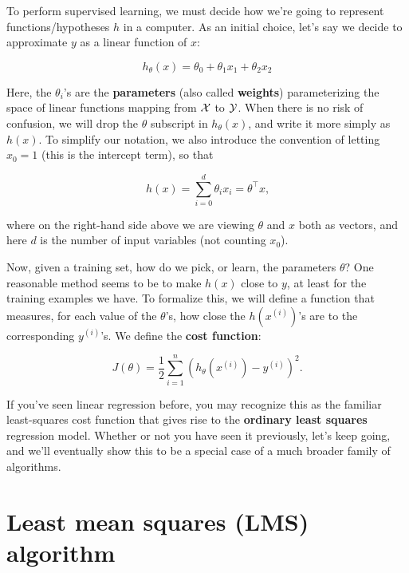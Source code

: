 To perform supervised learning, we must decide how we're going to represent
functions/hypotheses $h$ in a computer. As an initial choice, let's say
we decide to approximate $y$ as a linear function of $x$:

\begin{equation}
    h_\theta(x) = \theta_0 + \theta_1 x_1 + \theta_2 x_2
\end{equation}

Here, the $\theta_i$'s are the \textbf{parameters} (also called \textbf{weights}) parameterizing the
space of linear functions mapping from $\cal X$ to $\cal Y$. When there is no risk of
confusion, we will drop the $\theta$ subscript in $h_\theta(x)$, and write it more simply as
$h(x)$. To simplify our notation, we also introduce the convention of letting
$x_0 = 1$ (this is the intercept term), so that

\begin{equation}
    h(x) = \sum_{i=0}^d \theta_i x_i = \theta^\top x\text{,} %
\end{equation}

where on the right-hand side above we are viewing $\theta$ and $x$ both as vectors,
and here $d$ is the number of input variables (not counting $x_0$).

Now, given a training set, how do we pick, or learn, the parameters $\theta$?
One reasonable method seems to be to make $h(x)$ close to $y$, at least for
the training examples we have. To formalize this, we will define a function
that measures, for each value of the $\theta$'s, how close the $h(x^{(i)})$'s are to the
corresponding $y^{(i)}$'s. We define the \textbf{cost function}:

\begin{equation}
    J(\theta) = \frac 1 2 \sum_{i=1}^n \left( h_\theta(x^{(i)}) - y^{(i)} \right)^2\text{.}
\end{equation}

If you've seen linear regression before, you may recognize this as the familiar
least-squares cost function that gives rise to the \textbf{ordinary least squares}
regression model. Whether or not you have seen it previously, let's keep
going, and we'll eventually show this to be a special case of a much broader
family of algorithms.


\section{Least mean squares (LMS) algorithm} %

